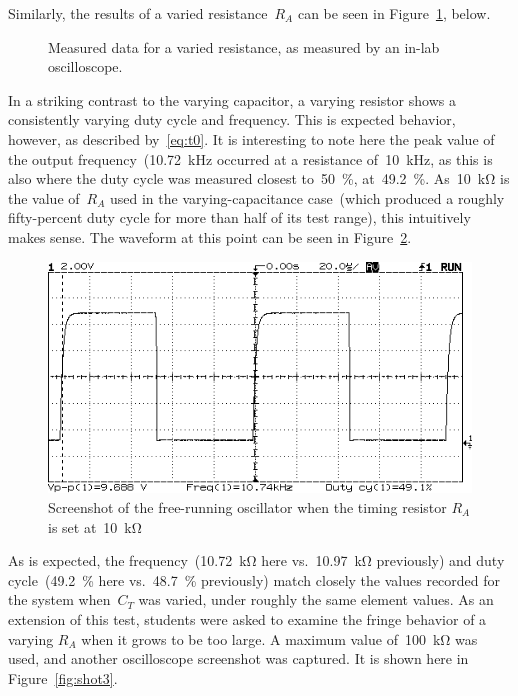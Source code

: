 Similarly, the results of a varied resistance~$R_A$ can be seen in
Figure~\ref{fig:free_run_r}, below.
%
\begin{figure}[H]
	\centering
	
	\parbox{.6\textwidth}{
	\caption[Free Running Oscillator --- Varying $R_A$]{Measured data for a
	varied resistance, as measured by an in-lab oscilloscope.}
	\label{fig:free_run_r}}
\end{figure}
%
In a striking contrast to the varying capacitor, a varying resistor shows a
consistently varying duty cycle and frequency.  This is expected behavior,
however, as described by~\eqref{eq:t0}.  It is interesting to note here the
peak value of the output frequency~(\SI{10.72}{\kilo\hertz} occurred at a
resistance of~\SI{10}{\kilo\hertz}, as this is also where the duty cycle was
measured closest to~\SI{50}{\percent}, at~\SI{49.2}{\percent}.
As~\SI{10}{\kilo\ohm} is the value of~$R_A$ used in the varying-capacitance
case~(which produced a roughly fifty-percent duty cycle for more than half of
its test range), this intuitively makes sense.  The waveform at this point can
be seen in Figure~\ref{fig:shot4}.
%
\begin{figure}[H]
	\centering
	\includegraphics[width=.6\textwidth]{img/shot/shot4.png}
	\parbox{.6\textwidth}{
	\caption[Free Running Oscillator --- Varying $R_A$ at \SI{49.2}{\percent}
	Duty Cycle]{Screenshot of the free-running oscillator when the timing
	resistor $R_A$ is set at~\SI{10}{\kilo\ohm}}
	\label{fig:shot4}}
\end{figure}
%
As is expected, the frequency~(\SI{10.72}{\kilo\ohm} here
vs.\ \SI{10.97}{\kilo\ohm} previously) and duty cycle~(\SI{49.2}{\percent} here
vs.\ \SI{48.7}{\percent} previously) match closely the values recorded for the
system when~$C_T$ was varied, under roughly the same element values.  As an
extension of this test, students were asked to examine the fringe behavior of a
varying $R_A$ when it grows to be too large.  A maximum value
of~\SI{100}{\kilo\ohm} was used, and another oscilloscope screenshot was
captured.  It is shown here in Figure~\ref{fig:shot3}.
%

